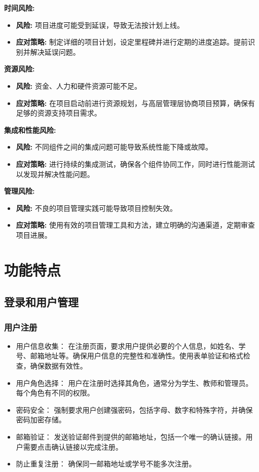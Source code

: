 \documentclass{article}
\begin{document}
\textbf{时间风险:}
\begin{itemize}
    \item \textbf{风险:} 项目进度可能受到延误，导致无法按计划上线。
    \item \textbf{应对策略:} 制定详细的项目计划，设定里程碑并进行定期的进度追踪。提前识别并解决延误问题。
\end{itemize}

\textbf{资源风险:}
\begin{itemize}
    \item \textbf{风险:} 资金、人力和硬件资源可能不足。
    \item \textbf{应对策略:} 在项目启动前进行资源规划，与高层管理层协商项目预算，确保有足够的资源支持项目需求。
\end{itemize}

\textbf{集成和性能风险:}
\begin{itemize}
    \item \textbf{风险:} 不同组件之间的集成问题可能导致系统性能下降或故障。
    \item \textbf{应对策略:} 进行持续的集成测试，确保各个组件协同工作，同时进行性能测试以发现并解决性能问题。
\end{itemize}

\textbf{管理风险:}
\begin{itemize}
    \item \textbf{风险:} 不良的项目管理实践可能导致项目控制失效。
    \item \textbf{应对策略:} 使用有效的项目管理工具和方法，建立明确的沟通渠道，定期审查项目进展。
\end{itemize}

\section{功能特点}

\subsection{登录和用户管理}
\subsubsection{用户注册}
\begin{itemize}
  \item 用户信息收集： 在注册页面，要求用户提供必要的个人信息，如姓名、学号、邮箱地址等。确保用户信息的完整性和准确性。使用表单验证和格式检查，确保数据有效性。
  \item 用户角色选择： 用户在注册时选择其角色，通常分为学生、教师和管理员。每个角色有不同的权限。
  \item 密码安全： 强制要求用户创建强密码，包括字母、数字和特殊字符，并确保密码加密存储。
  \item 邮箱验证： 发送验证邮件到提供的邮箱地址，包括一个唯一的确认链接。用户需要点击确认链接以完成注册。
  \item 防止重复注册： 确保同一邮箱地址或学号不能多次注册。
\end{itemize}
\end{document}
